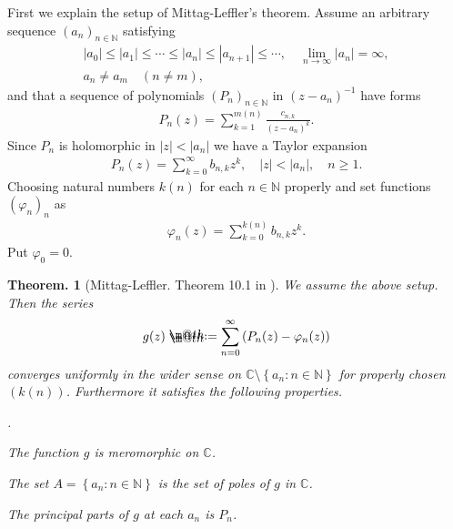 \documentclass[openany, a4paper, oneside]{book}
\makeatletter
\newcounter{enum2}
\renewenvironment{enumerate}{%
\begin{list}%
{%
\arabic{enum2}.\ \,%
}%
{%
\usecounter{enum2}
\setlength{\itemindent}{0pt}%
\setlength{\leftmargin}{6pt}%
\setlength{\rightmargin}{0pt}%
\setlength{\labelsep}{0pt}%
\setlength{\labelwidth}{6pt}%
\setlength{\itemsep}{0pt}%
\setlength{\parsep}{0pt}%
\setlength{\listparindent}{0pt}%
}
}{%
\end{list}%
}
\newcommand*{\defeq}{\mathrel{\rlap{%
\raisebox{0.3ex}{$\m@th\cdot$}}%
\raisebox{-0.3ex}{$\m@th\cdot$}}%
=}
\theoremstyle{break}
\newtheorem{thm}{Theorem.}[section]
\theoremstyle{breakdefn}
\newcommand{\abs}[1]{\left|#1\right|}
\newcommand{\rbk}[1]{\left (#1\right)}
\newcommand{\set}[2]{\left\{#1 : #2\right\}}
\newcommand{\bbC}{\mathbb{C}}
\newcommand{\bbN}{\mathbb{N}}
\makeatother
\begin{document}
First we explain the setup of Mittag-Leffler's theorem.
Assume an arbitrary sequence $(a_n)_{n \in \bbN}$ satisfying
\begin{gather}
 \abs{a_0} \leq \abs{a_1} \leq \cdots \leq \abs{a_n} \leq \abs{a_{n+1}} \leq \cdots, \quad \lim_{n \to \infty} \abs{a_n} = \infty, \\
 a_n \neq a_m \quad (n \neq m),
\end{gather}
and that a sequence of polynomials $(P_n)_{n \in \bbN}$ in $(z - a_n)^{-1}$ have forms
\begin{align}
 P_n (z)
 =
 \sum_{k=1}^{m (n)} \frac{c_{n,k}}{(z - a_n)^k}.
\end{align}
Since $P_n$ is holomorphic in $\abs{z} < \abs{a_n}$ we have a Taylor expansion
\begin{align}
 P_n (z)
 =
 \sum_{k=0}^{\infty} b_{n,k} z^k, \quad \abs{z} < \abs{a_n}, \quad n \geq 1.
\end{align}
Choosing natural numbers $k (n)$ for each $n \in \bbN$ properly and set functions $(\varphi_n)_n$ as
\begin{align}
 \varphi_n (z)
 =
 \sum_{k=0}^{k (n)} b_{n, k} z^k.
\end{align}
Put $\varphi_0 = 0$.
\begin{thm}[Mittag-Leffler. Theorem 10.1 in \cite{MitsuoSugiura2}]
 We assume the above setup.
 Then the series
 \begin{align}
  g (z)
  \defeq
  \sum_{n=0}^{\infty} \rbk{P_n (z) - \varphi_n (z)}
 \end{align}
 converges uniformly in the wider sense on $\bbC \setminus \set{a_n}{n \in \bbN}$ for properly chosen $(k (n))$.
 Furthermore it satisfies the following properties.
\begin{enumerate}
\item The function $g$ is meromorphic on $\bbC$.
\item The set $A = \set{a_n}{n \in \bbN}$ is the set of poles of $g$ in $\bbC$.
\item The principal parts of $g$ at each $a_n$ is $P_n$.
\end{enumerate}
\end{thm}
\end{document}
